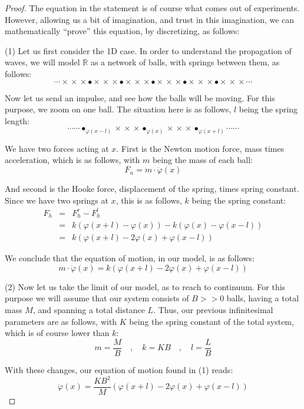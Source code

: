 \documentclass[12pt]{amsbook}
\begin{document}
\begin{proof}
The equation in the statement is of course what comes out of experiments. However, allowing us a bit of imagination, and trust in this imagination, we can mathematically ``prove'' this equation, by discretizing, as follows:

\medskip

(1) Let us first consider the 1D case. In order to understand the propagation of waves, we will model $\mathbb R$ as a network of balls, with springs between them, as follows:
$$\cdots\times\!\!\!\times\!\!\!\times\bullet\times\!\!\!\times\!\!\!\times\bullet\times\!\!\!\times\!\!\!\times\bullet\times\!\!\!\times\!\!\!\times\bullet\times\!\!\!\times\!\!\!\times\bullet\times\!\!\!\times\!\!\!\times\cdots$$

Now let us send an impulse, and see how the balls will be moving. For this purpose, we zoom on one ball. The situation here is as follows, $l$ being the spring length:
$$\cdots\cdots\bullet_{\varphi(x-l)}\times\!\!\!\times\!\!\!\times\bullet_{\varphi(x)}\times\!\!\!\times\!\!\!\times\bullet_{\varphi(x+l)}\cdots\cdots$$

We have two forces acting at $x$. First is the Newton motion force, mass times acceleration, which is as follows, with $m$ being the mass of each ball:
$$F_n=m\cdot\ddot{\varphi}(x)$$

And second is the Hooke force, displacement of the spring, times spring constant. Since we have two springs at $x$, this is as follows, $k$ being the spring constant:
\begin{eqnarray*}
F_h
&=&F_h^r-F_h^l\\
&=&k(\varphi(x+l)-\varphi(x))-k(\varphi(x)-\varphi(x-l))\\
&=&k(\varphi(x+l)-2\varphi(x)+\varphi(x-l))
\end{eqnarray*}

We conclude that the equation of motion, in our model, is as follows:
$$m\cdot\ddot{\varphi}(x)=k(\varphi(x+l)-2\varphi(x)+\varphi(x-l))$$

(2) Now let us take the limit of our model, as to reach to continuum. For this purpose we will assume that our system consists of $B>>0$ balls, having a total mass $M$, and spanning a total distance $L$. Thus, our previous infinitesimal parameters are as follows, with $K$ being the spring constant of the total system, which is of course lower than $k$:
$$m=\frac{M}{B}\quad,\quad k=KB\quad,\quad l=\frac{L}{B}$$

With these changes, our equation of motion found in (1) reads:
$$\ddot{\varphi}(x)=\frac{KB^2}{M}(\varphi(x+l)-2\varphi(x)+\varphi(x-l))$$


\end{proof}
\end{document}
